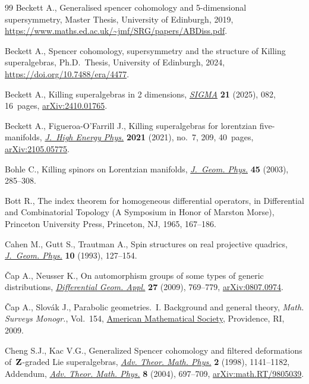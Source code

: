 \documentclass[pdftex]{sigma}
\numberwithin{equation}{section}
\newcommand{\1}{\mathbbm{1}}
\begin{document}
\begin{thebibliography}{99}
Beckett A., Generalised spencer cohomology and 5-dimensional supersymmetry,
 {M}aster Thesis, {U}niversity of Edinburgh, 2019,
 \url{https://www.maths.ed.ac.uk/~jmf/SRG/papers/ABDiss.pdf}.

Beckett A., Spencer cohomology, supersymmetry and the structure of {K}illing
 superalgebras, Ph.D.~Thesis, {U}niversity of Edinburgh, 2024,
 \url{https://doi.org/10.7488/era/4477}.

Beckett A., Killing superalgebras in 2 dimensions,
 \href{https://doi.org/10.3842/SIGMA.2025.082}{\textit{SIGMA}} \textbf{21}
 (2025), 082, 16~pages,
 \href{http://arxiv.org/abs/2410.01765}{arXiv:2410.01765}.

Beckett A., Figueroa-O'Farrill J., Killing superalgebras for lorentzian
 five-manifolds,
 \href{https://doi.org/10.1007/jhep07(2021)209}{\textit{J.~High Energy Phys.}}
 \textbf{2021} (2021), no.~7, 209, 40~pages,
 \href{http://arxiv.org/abs/2105.05775}{arXiv:2105.05775}.

Bohle C., Killing spinors on {L}orentzian manifolds,
 \href{https://doi.org/10.1016/S0393-0440(01)00047-X}{\textit{J.~Geom. Phys.}}
 \textbf{45} (2003), 285--308.

Bott R., The index theorem for homogeneous differential operators, in
 Differential and {C}ombinatorial {T}opology ({A} {S}ymposium in {H}onor of
 {M}arston {M}orse), Princeton University Press, Princeton, NJ, 1965,
 167--186.

Cahen M., Gutt S., Trautman A., Spin structures on real projective quadrics,
 \href{https://doi.org/10.1016/0393-0440(93)90025-A}{\textit{J.~Geom. Phys.}}
 \textbf{10} (1993), 127--154.

{\v{C}}ap A., Neusser K., On automorphism groups of some types of generic
 distributions,
 \href{https://doi.org/10.1016/j.difgeo.2009.05.003}{\textit{Differential
 Geom. Appl.}} \textbf{27} (2009), 769--779,
 \href{http://arxiv.org/abs/0807.0974}{arXiv:0807.0974}.

{\v{C}}ap A., Slov\'{a}k J., Parabolic geometries.~{I}. Background and general
 theory, \textit{Math. Surveys Monogr.}, Vol.~154,
 \href{https://doi.org/10.1090/surv/154}{American Mathematical Society},
 Providence, RI, 2009.

Cheng S.J., Kac V.G., Generalized {S}pencer cohomology and filtered
 deformations of~{${\bf Z}$}-graded {L}ie superalgebras,
 \href{https://doi.org/10.4310/ATMP.1998.v2.n5.a7}{\textit{Adv. Theor. Math.
 Phys.}} \textbf{2} (1998), 1141--1182, {A}ddendum,
 \href{https://doi.org/10.4310/ATMP.2004.v8.n4.a2}{\textit{Adv. Theor. Math.
 Phys.}} \textbf{8} (2004), 697--709,
 \href{http://arxiv.org/abs/math.RT/9805039}{arXiv:math.RT/9805039}.


\end{thebibliography}
\end{document}
